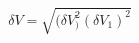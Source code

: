 \begin{equation}
\label{eq:delta_V_Malus}
\delta V = \sqrt{ (\delta V_)^2 (\delta V_1)^2}
\end{equation}